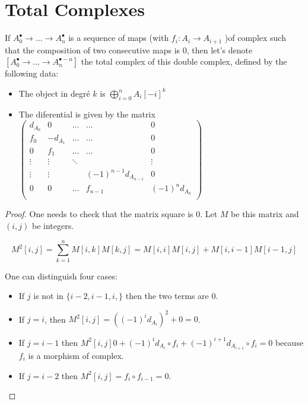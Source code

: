 \section{Total Complexes}
\begin{definition}\label{def:total_complex}
    If $A_0^{\bullet}\to\ldots \to A_n^{\bullet}$ is a sequence of maps (with $f_i:A_i\to A_{i+1}$ )of complex such that the composition of two consecutive maps is $0$, then let's denote $[A_0^{\bullet}\to\ldots \to A_n^{\bullet-n}]$ the total complex of this double complex, defined by the following data:\begin{itemize}
        \item The object in degré $k$ is $\bigoplus\limits_{i=0}^n A_i[-i]^k$
        \item The diferential is given by the matrix $\begin{pmatrix}
            d_{A_0} & 0 & \ldots & \ldots & 0\\
            f_0 & -d_{A_1} & \ldots & \ldots & 0\\
            0 & f_1 & \ldots & \ldots & 0\\
            \vdots & \vdots & \ddots &  & \vdots\\
            \vdots & \vdots & & (-1)^{n-1}d_{A_{n-1}} & 0\\
            0 & 0 & \ldots & f_{n-1} & (-1)^nd_{A_n}\\
            \end{pmatrix}$
    \end{itemize}
\end{definition}

\begin{proof}
    One needs to check that the matrix square is $0$. Let $M$ be this matrix and $(i,j)$ be integers.

    \[M^2[i,j]=\sum\limits_{k=1}^n M[i,k]M[k,j]= M[i,i] M[i,j]+M[i,i-1]M[i-1,j]\]

    One can distinguish four cases:\begin{itemize}

        \item If $j$ is not in $\{i-2,i-1,i,\}$ then the two terms are $0$. 
        \item If $j=i$, then $M^2[i,j]=((-1)^i d_{A_i})^2+0=0$. 
        \item If $j=i-1$ then $M^2[i,j]0+(-1)^i d_{A_i}\circ f_i+ (-1)^{i+1}d_{A_{i+1}}\circ f_i=0$ because $f_i$ is a morphism of complex.
        \item If $j=i-2$ then $M^2[i,j]=f_{i}\circ f_{i-1}=0$.
    \end{itemize}
\end{proof}

